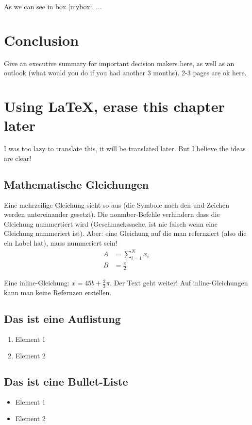 \documentclass[12pt,oneside]{article}
\begin{document}
As we can see in box \ref{mybox}, ...
\section{Conclusion}
Give an executive summary for important decision makers here, as well as an outlook (what would you do if you had another 3 months). 2-3 pages are ok here.

\section{Using LaTeX, erase this chapter later}
%
I was too lazy to translate this, it will be translated later. But I believe the ideas are clear!
%
\subsection{Mathematische Gleichungen}
Eine mehrzeilige Gleichung sieht so aus (die Symbole nach den und-Zeichen werden untereinander gesetzt). Die nonmber-Befehle verhindern dass die Gleichung nummertiert wird (Geschmackssache, ist nie falsch wenn eine Gleichung nummeriert ist). Aber: eine Gleichung auf die man refernziert (also die ein Label hat), muss nummeriert sein!
\begin{align}
    A &= \sum_{i=1}^N x_i \label{eq:1}\nonumber\\
    B &= \frac{\pi}{2}
\end{align}

Eine inline-Gleichung: $x=45b + \frac{2}{3}\pi$. Der Text geht weiter! Auf inline-Gleichungen kann man keine Refernzen erstellen.

\subsection{Das ist eine Auflistung}
\begin{enumerate}
\item Element 1
\item Element 2
\end{enumerate}

\subsection{Das ist eine Bullet-Liste}
\begin{itemize}
\item Element 1
\item Element 2
\end{itemize}
\end{document}
